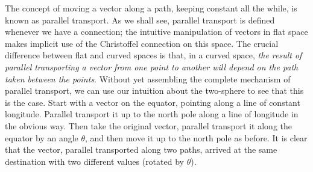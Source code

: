 The concept of moving a vector along a path, keeping constant all
the while, is known as parallel transport.  As we shall see, parallel
transport is defined whenever we have a connection; the intuitive
manipulation of vectors in flat space makes implicit use of the
Christoffel connection on this space.  The crucial difference between
flat and curved spaces is that, in a curved space, {\it the result
of parallel transporting a vector from one point to another will
depend on the path taken between the points}.  Without yet assembling
the complete mechanism of parallel transport, we can use our 
intuition about the two-sphere to see that this is the case. Start
with a vector on the equator, pointing along a line of constant
longitude.  Parallel transport it up to the north pole along a line
of longitude in the
obvious way.  Then take the original vector, parallel transport it
along the equator by an angle $\theta$, and then move it up to the
north pole as before.
It is clear that the vector, parallel transported along two paths,
arrived at the same destination with two different values (rotated
by $\theta$).

\begin{figure}[h]
  \centerline{
  }
\end{figure}

